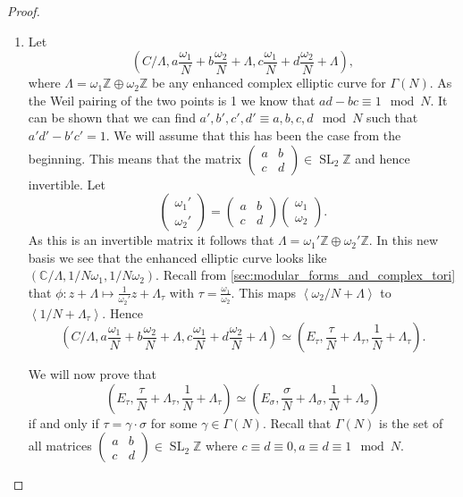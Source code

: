 \documentclass[a4paper]{article}
\theoremstyle{theoremdd}
\theoremstyle{definitiondd}
\theoremstyle{remarkdd}
\newcommand{\Z}{\mathbb{Z}}
\newcommand{\C}{\mathbb{C}}
\DeclareMathOperator{\SL}{SL}
\begin{document}
\begin{proof}
\begin{enumerate}
	\item Let 
		\[\left( C / \Lambda, a \frac{\omega_1}{N} + b \frac{\omega_2}{N} + \Lambda,  c \frac{\omega_1}{N}  + d \frac{\omega_2}{N}  + \Lambda \right) ,\]
	where $\Lambda = \omega_1 \Z \oplus \omega_2 \Z$ be any enhanced complex elliptic curve for $\Gamma(N)$.
	As the Weil pairing of the two points is 1 we know that $ad - bc \equiv 1 \mod N $. 
	It can be shown that we can find $a', b', c', d' \equiv a, b, c, d \mod N$ such that  $a'd' - b'c' = 1$. 
	We will assume that this has been the case from the beginning.  This means that the matrix  $\begin{pmatrix} a & b \\ c& d \end{pmatrix}  \in \SL_2\Z$ and hence invertible.  Let \[
		\begin{pmatrix} \omega_1' \\ \omega_2' \end{pmatrix}  = 
		\begin{pmatrix} a & b \\ c & d \end{pmatrix} 
		\begin{pmatrix} \omega_1 \\ \omega_2 \end{pmatrix} 
	.\] 
	As this is an invertible matrix it follows that $\Lambda = \omega_1' \Z \oplus \omega_2' \Z$. 
	In this new basis we see that the enhanced elliptic curve looks like $(\C / \Lambda, 1 / N \omega_1,  1 / N \omega_2)$.
	Recall from \cref{sec:modular_forms_and_complex_tori} that  $\phi: z  + \Lambda \mapsto  \frac{1}{\omega_2'} z + \Lambda_\tau$ with $\tau = \frac{\omega_1}{\omega_2}$. 
	This maps  $\left<\omega_2 / N  + \Lambda \right>$ to $\left<1 / N + \Lambda_\tau \right>$.
	Hence  \[
		\left( C / \Lambda, a \frac{\omega_1}{N} + b \frac{\omega_2}{N} + \Lambda,  c \frac{\omega_1}{N}  + d \frac{\omega_2}{N}  + \Lambda \right)
		\simeq
		\left( E_\tau, \frac{\tau}{N} + \Lambda_\tau, \frac{1}{N} + \Lambda_\tau \right)
	.\] 

	We will now prove that \[
		\left( E_\tau , \frac{\tau}{N} + \Lambda_\tau, \frac{1}{N} + \Lambda_\tau \right) \simeq 
		\left( E_\sigma, \frac{\sigma}{N} + \Lambda_ \sigma, \frac{1}{N} + \Lambda_\sigma \right) 
	\]
	if and only if $\tau = \gamma \cdot \sigma$ for some $\gamma \in \Gamma(N)$.
	Recall that $\Gamma(N)$ is the set of all matrices $\begin{pmatrix} a & b \\ c & d \end{pmatrix} \in \SL_2\Z$ where $c \equiv d \equiv 0, a \equiv d \equiv 1 \mod N$. 


\end{enumerate}
\end{proof}
\end{document}
